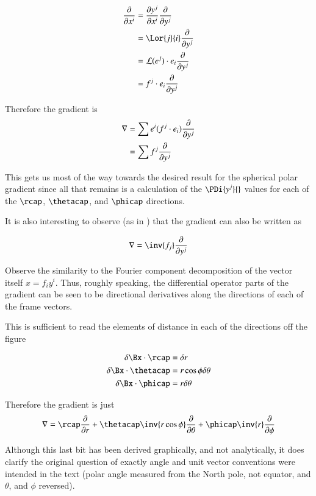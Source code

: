 \begin{align*}
\PD{x^i}{} 
&= \PD{x^i}{y^j} \PD{y^j}{} \\
&= \Lor{j}{i} \PD{y^j}{} \\
&= \LL(e^j) \cdot e_i \PD{y^j}{} \\
&= f^j \cdot e_i \PD{y^j}{}
\end{align*}

Therefore the gradient is
\begin{align*}
\nabla &= \sum e^i (f^j \cdot e_i) \frac{\partial {}}{\partial {y^j}} \\
      &= \sum f^j \frac{\partial {}}{\partial {y^j}} \\
\end{align*}

This gets us most of the way towards the desired result for the spherical polar gradient since all that remains is a calculation of the $\PDi{y^j}{}$
values for
each of the $\rcap$, $\thetacap$, and $\phicap$ directions.

It is also interesting to observe (as in \cite{DenkerMaxwell}) that the gradient can also be written as

\begin{align*}
\grad &= \inv{f_j} \PD{y^j}{} \\
\end{align*}

Observe the similarity to the Fourier component decomposition of the vector itself $x = f_i y^i$.  Thus, roughly speaking, the differential operator
parts of the gradient can be seen to be directional derivatives 
along the directions of each of the frame vectors.

This is sufficient to read the elements of distance in each of the directions
off the figure

\begin{align*}
\delta \Bx \cdot \rcap &= \delta r \\
\delta \Bx \cdot \thetacap &= r \cos\phi \delta \theta \\
\delta \Bx \cdot \phicap &= r \delta \theta \\
\end{align*}

Therefore the gradient is just
\begin{align}
\grad = 
\rcap \PD{r}{}
+\thetacap \inv{r \cos\phi} \PD{\theta}{} 
+\phicap \inv{r} \PD{\phi}{}
\end{align}

Although this last bit has been
derived graphically, and not analytically, it does
clarify the original question of exactly angle and unit vector 
conventions were intended in the text (polar angle measured from the North pole, not equator, and $\theta$, and $\phi$ reversed).

